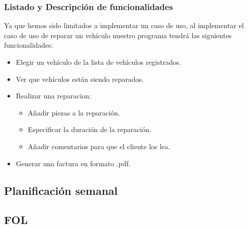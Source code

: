 \documentclass{article}
\begin{document}
\subsubsection{Listado y Descripción de funcionalidades}
Ya que hemos sido limitados a implementar un caso de uso, al implementar el caso de uso de reparar un vehículo nuestro programa tendrá las siguientes funcionalidades:\\
\begin{itemize}
  \item Elegir un vehículo de la lista de vehículos registrados.
  \item Ver que vehículos están siendo reparados.
  \item Realizar una reparacion: \begin{itemize}
    \item Añadir piezas a la reparación.
    \item Especificar la duración de la reparación.
    \item Añadir comentarios para que el cliente los lea.
  \end{itemize}
  \item Generar una factura en formato .pdf.
\end{itemize}
\subsection{Planificación semanal}
\subsection{FOL}
\clearpage
\end{document}
